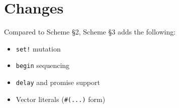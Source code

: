 





\section{Changes}

Compared to Scheme \S 2, Scheme \S 3 adds the following:
\begin{itemize}
  \item \texttt{set!} mutation
  \item \texttt{begin} sequencing
  \item \texttt{delay} and promise support
  \item Vector literals (\texttt{\#(...)} form)
\end{itemize}



\newpage



\newpage



\newpage



\newpage



\newpage



\newpage



\newpage





\newpage




